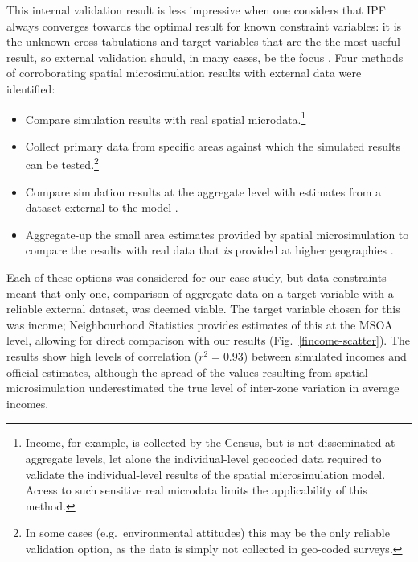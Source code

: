 This internal validation
result is less impressive when one considers that IPF always converges
towards the optimal result for known constraint variables:
it is the unknown cross-tabulations and
target variables that are the the most useful result,
so external validation should, in many cases, be the focus
\citep{Morrissey2008, edwards2013validation}.
Four methods of corroborating spatial microsimulation results with external
data were identified:
\begin{itemize}
 \item Compare simulation results with real spatial microdata.\footnote{Income,
for example, is collected by the Census, but is not disseminated at aggregate
levels, let alone the individual-level geocoded data required to validate the
individual-level results of the spatial microsimulation model. Access to such
sensitive real microdata limits the applicability of this method.}
\item Collect primary data from specific areas against which the simulated
results can be tested.\footnote{In some cases (e.g.~environmental attitudes)
this may be the only reliable validation option, as the data is simply not
collected in geo-coded surveys.}
\item Compare simulation results at the aggregate level with estimates
from a dataset external to the model \citep{Morrissey2013}.
\item Aggregate-up the small area estimates provided by spatial microsimulation
to compare the results with real data that \emph{is} provided at higher
geographies \citep{Edwards2009}.
\end{itemize}
Each of these options was considered for our case study,
but data constraints meant that only one, comparison of aggregate data
on a target variable with a reliable external dataset, was deemed viable.
The target variable chosen for this was income; Neighbourhood Statistics
provides estimates of this at the MSOA level, allowing
for direct comparison with our results (Fig.~\ref{fincome-scatter}). The results show
high levels of correlation ($r^2 = 0.93$) between simulated incomes and official
estimates, although the spread of the values resulting from spatial microsimulation
underestimated the true level of inter-zone variation in average incomes.

